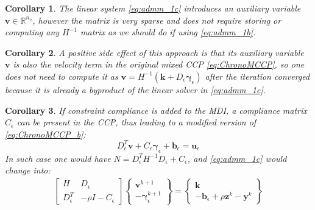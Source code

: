 \documentclass[final,3p]{elsarticle}
\newcommand{\vect}[1]{\bm{#1}}
\newtheorem{corollary}{Corollary}[theorem]
\begin{document}
\begin{corollary}
The linear system \eqref{eq:admm_1c} introduces an auxiliary variable $\vect{v} \in \mathbb{R}^{n_v}$, however the matrix is very sparse and does not require storing or computing any $H^{-1}$ matrix as we should do if using \eqref{eq:admm_1b}.
\end{corollary}

\begin{corollary}
A positive side effect of this approach is that its auxiliary variable $\vect{v}$ is also the velocity term in the original mixed CCP 
\eqref{eq:ChronoMCCP}, so one does not need to compute it as $\vect{v}=H^{-1}(\vect{k} + D_\epsilon \vect{\gamma}_\epsilon )$ after the iteration converged because it is already a byproduct of the linear solver in \eqref{eq:admm_1c}.
\end{corollary}

\begin{corollary}
If constraint compliance is added to the MDI, a compliance matrix $C_\epsilon$ can be present in the CCP, thus leading to a modified version of \eqref{eq:ChronoMCCP_b}:
\[
D_{\epsilon}^T \vect{v}  +C_\epsilon \vect{\gamma}_\epsilon + \vect{b}_\epsilon = \vect{u}_\epsilon
\]
In such case one would have $N=D_{\epsilon}^T H^{-1} D_{\epsilon} + C_\epsilon$, and \eqref{eq:admm_1c} would change into: 
\begin{subequations}
	\begin{align}
    \begin{bmatrix}
		 H   & D_\epsilon \\
		 D_\epsilon^T & - \rho I - C_\epsilon
		\end{bmatrix}
		\begin{Bmatrix}
		 \vect{v}^{k+1}   \\
		 -\vect{\gamma}_\epsilon^{k+1} 
		\end{Bmatrix}
		=
		\begin{Bmatrix}
		 \vect{k} \\
		 -\vect{b}_\epsilon + \rho \vect{z}^k -\vect{y}^k 
		\end{Bmatrix}
	\end{align}
	\label{eq:admm_1c_compl}
\end{subequations}
\end{corollary}
\end{document}
